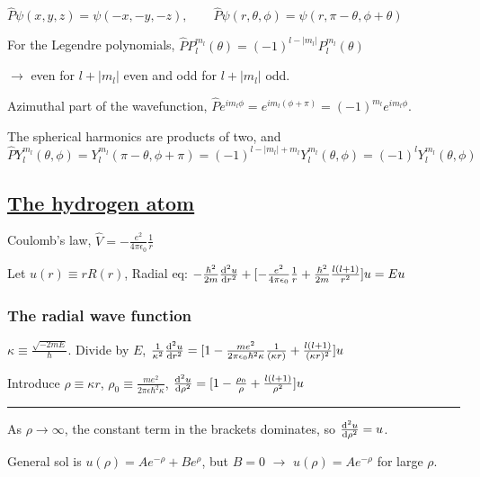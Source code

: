 \hfill

$\widehat{P} \psi(x, y, z) = \psi(-x, -y, -z), \qquad \widehat{P} \psi(r, \theta, \phi) = \psi(r, \pi - \theta, \phi + \theta)$

For the Legendre polynomials, $\widehat{P} P_l^{m_l} (\theta) = (-1)^{l - |m_l|} P_l^{m_l} (\theta)$

$\rightarrow$ even for $l + |m_l|$ even and odd for $l + |m_l|$ odd.

Azimuthal part of the wavefunction, $\widehat{P} e^{im_l \phi} = e^{i m_l (\phi + \pi)} = (-1)^{m_l} e^{i m_l \phi}$.

The spherical harmonics are products of two, and 
$\widehat{P} Y_l^{m_l} (\theta, \phi) = Y_l^{m_l} (\pi - \theta, \phi + \pi) = (-1)^{l - |m_l| + m_l} Y_l^{m_l}(\theta, \phi) = (-1)^{l} Y_l^{m_l} (\theta, \phi)$

\subsection{\underline{The hydrogen atom}}

Coulomb's law, $\widehat{V} = - \frac{e^2}{4 \pi \epsilon_0} \frac{1}{r}$

Let $u(r) \equiv r R(r)$, Radial eq: $-\frac{\hbar^2}{2m} \dv[2]{u}{r} + [-\frac{e^2}{4 \pi \epsilon_0} \frac{1}{r} + \frac{\hbar^2}{2m} \frac{l (l+1)}{r^2}]u = Eu$

\subsubsection{The radial wave function}

\hfill

$\kappa \equiv \frac{\sqrt{-2mE}}{\hbar}$.
Divide by $E$, 
$\frac{1}{\kappa^2} \dv[2]{u}{r} = [1 - \frac{me^2}{2 \pi \epsilon_0 \hbar^2 \kappa} \frac{1}{(\kappa r)} + \frac{l (l+1)}{(\kappa r)^2}] u$

Introduce $\rho \equiv \kappa r$, $\rho_0 \equiv \frac{me^2}{2 \pi \epsilon \hbar^2 \kappa}$, $\dv[2]{u}{\rho} = [1 - \frac{\rho_0}{\rho} + \frac{l(l+1)}{\rho^2}]u$

\hrule height 0.1pt

As $\rho \rightarrow \infty$, the constant term in the brackets dominates, so $\dv[2]{u}{\rho} = u$.

General sol is $u(\rho) = Ae^{-\rho} + Be^{\rho}$, but $B=0$ $\rightarrow$ $u(\rho) = A e^{-\rho}$ for large $\rho$.

